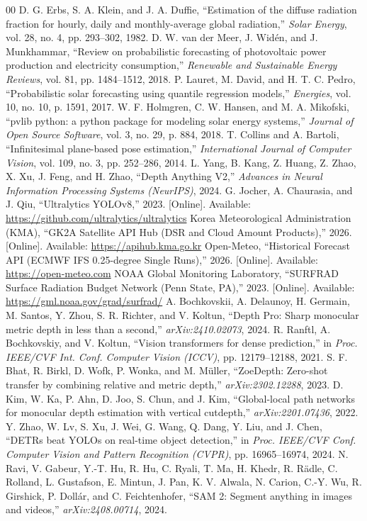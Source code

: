 \documentclass[conference]{IEEEtran}
\begin{document}
\begin{thebibliography}{00}
 D. G. Erbs, S. A. Klein, and J. A. Duffie, ``Estimation of the diffuse radiation fraction for hourly, daily and monthly-average global radiation,'' \textit{Solar Energy}, vol. 28, no. 4, pp. 293--302, 1982.
 D. W. van der Meer, J. Wid\'{e}n, and J. Munkhammar, ``Review on probabilistic forecasting of photovoltaic power production and electricity consumption,'' \textit{Renewable and Sustainable Energy Reviews}, vol. 81, pp. 1484--1512, 2018.
 P. Lauret, M. David, and H. T. C. Pedro, ``Probabilistic solar forecasting using quantile regression models,'' \textit{Energies}, vol. 10, no. 10, p. 1591, 2017.
 W. F. Holmgren, C. W. Hansen, and M. A. Mikofski, ``pvlib python: a python package for modeling solar energy systems,'' \textit{Journal of Open Source Software}, vol. 3, no. 29, p. 884, 2018.
 T. Collins and A. Bartoli, ``Infinitesimal plane-based pose estimation,'' \textit{International Journal of Computer Vision}, vol. 109, no. 3, pp. 252--286, 2014.
 L. Yang, B. Kang, Z. Huang, Z. Zhao, X. Xu, J. Feng, and H. Zhao, ``Depth Anything V2,'' \textit{Advances in Neural Information Processing Systems (NeurIPS)}, 2024.
 G. Jocher, A. Chaurasia, and J. Qiu, ``Ultralytics YOLOv8,'' 2023. [Online]. Available: \url{https://github.com/ultralytics/ultralytics}
 Korea Meteorological Administration (KMA), ``GK2A Satellite API Hub (DSR and Cloud Amount Products),'' 2026. [Online]. Available: \url{https://apihub.kma.go.kr}
 Open-Meteo, ``Historical Forecast API (ECMWF IFS 0.25-degree Single Runs),'' 2026. [Online]. Available: \url{https://open-meteo.com}
 NOAA Global Monitoring Laboratory, ``SURFRAD Surface Radiation Budget Network (Penn State, PA),'' 2023. [Online]. Available: \url{https://gml.noaa.gov/grad/surfrad/}
 A. Bochkovskii, A. Delaunoy, H. Germain, M. Santos, Y. Zhou, S. R. Richter, and V. Koltun, ``Depth Pro: Sharp monocular metric depth in less than a second,'' \textit{arXiv:2410.02073}, 2024.
 R. Ranftl, A. Bochkovskiy, and V. Koltun, ``Vision transformers for dense prediction,'' in \textit{Proc. IEEE/CVF Int. Conf. Computer Vision (ICCV)}, pp. 12179--12188, 2021.
 S. F. Bhat, R. Birkl, D. Wofk, P. Wonka, and M. M\"{u}ller, ``ZoeDepth: Zero-shot transfer by combining relative and metric depth,'' \textit{arXiv:2302.12288}, 2023.
 D. Kim, W. Ka, P. Ahn, D. Joo, S. Chun, and J. Kim, ``Global-local path networks for monocular depth estimation with vertical cutdepth,'' \textit{arXiv:2201.07436}, 2022.
 Y. Zhao, W. Lv, S. Xu, J. Wei, G. Wang, Q. Dang, Y. Liu, and J. Chen, ``DETRs beat YOLOs on real-time object detection,'' in \textit{Proc. IEEE/CVF Conf. Computer Vision and Pattern Recognition (CVPR)}, pp. 16965--16974, 2024.
 N. Ravi, V. Gabeur, Y.-T. Hu, R. Hu, C. Ryali, T. Ma, H. Khedr, R. R\"{a}dle, C. Rolland, L. Gustafson, E. Mintun, J. Pan, K. V. Alwala, N. Carion, C.-Y. Wu, R. Girshick, P. Doll\'{a}r, and C. Feichtenhofer, ``SAM 2: Segment anything in images and videos,'' \textit{arXiv:2408.00714}, 2024.
\end{thebibliography}
\end{document}

